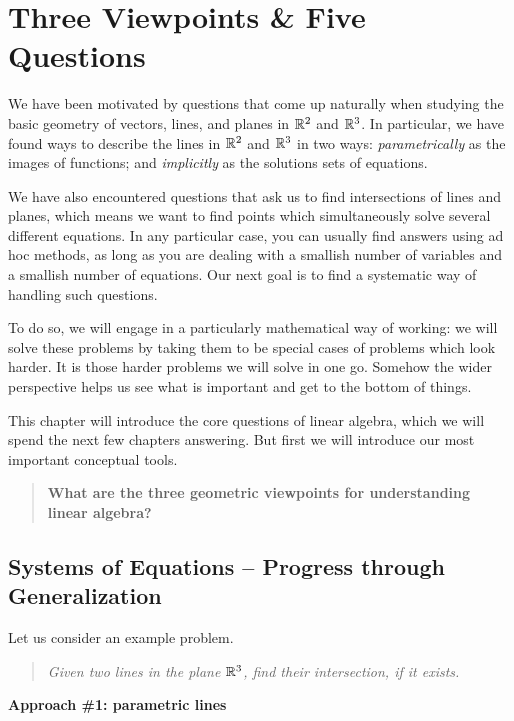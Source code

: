 \documentclass[00-livre-main.tex]{subfiles}
\begin{document}
\chapter{Three Viewpoints \& Five Questions}

We have been motivated by questions that come up naturally when studying the basic geometry of vectors, lines, and planes in $\mathbb{R}^2$ and $\mathbb{R}^3$. In particular, we have found ways to describe the lines in $\mathbb{R}^2$ and $\mathbb{R}^3$ in two ways: \emph{parametrically} as the images of functions; and \emph{implicitly} as the solutions sets of equations. 

We have also encountered questions that ask us to find intersections of lines and planes, which means we want to find points which simultaneously solve several different equations. In any particular case, you can usually find answers using ad hoc methods, as long as you are dealing with a smallish number of variables and a smallish number of equations. Our next goal is to find a systematic way of handling such questions. 

To do so, we will engage in a particularly mathematical way of working: we will solve these problems by taking them to be special cases of problems which look harder. It is those harder problems we will solve in one go. Somehow the wider perspective helps us see what is important and get to the bottom of things.

This chapter will introduce the core questions of linear algebra, which we will spend the next few chapters answering. But first we will introduce our most important conceptual tools.

\begin{quote}
\textbf{What are the three geometric viewpoints for understanding linear algebra?}
\end{quote}


\section*{Systems of Equations -- Progress through Generalization}

Let us consider an example problem.

\begin{quote}
\textit{Given two lines in the plane $\mathbb{R}^3$, find their intersection, if it exists.}
\end{quote}

\noindent\textbf{Approach \#1: parametric lines}
\end{document}
